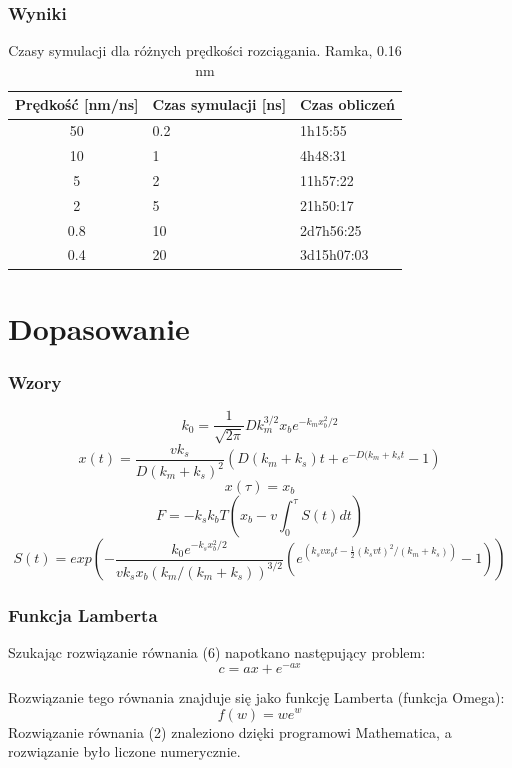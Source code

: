 \documentclass[10pt]{beamer}
\begin{document}
\begin{frame}
\frametitle{Wyniki}
\begin{center}
\begin{table}[h]
\centering
  \begin{tabular}{| c | l | l |}
  \hline
  Prędkość [nm/ns] & Czas symulacji [ns] & Czas obliczeń\\
  \hline
  50 & 0.2 & 1h15:55 \\
  10 & 1 & 4h48:31 \\
  5 & 2 & 11h57:22 \\
  2 & 5 & 21h50:17 \\
  0.8 & 10 & 2d7h56:25 \\
  0.4 & 20 & 3d15h07:03\\
  \hline
  \end{tabular}
  \caption{Czasy symulacji dla różnych prędkości rozciągania. Ramka, 0.16 nm}
\end{table}
\end{center}
\end{frame}
\section{Dopasowanie}

\begin{frame}
\frametitle{Wzory}
\begin{equation}
k_{0}=\frac{1}{\sqrt{2 \pi}}Dk_{m}^{3/2}x_{b}e^{-k_{m}x_{b}^{2}/2} 
\end{equation}
\begin{equation}
x(t)=\frac{vk_{s}}{D(k_{m}+k_{s})^{2}} (D(k_{m}+k_{s})t+e^{-D(k_{m}+k_{s}t}-1)
\end{equation}
\begin{equation}
x(\tau)=x_{b}
\end{equation}
\begin{equation}
F=-k_{s}k_{b}T(x_{b}-v \int_0^{\tau} S(t) dt)
\end{equation}
\begin{equation}
S(t)=exp(-\frac{k_{0}e^{-k_{s}x_{b}^{2}/2}}{vk_{s}x_{b}(k_{m}/(k_{m}+k_{s}))^{3/2}}(e^(k_{s}vx_{b}t-\frac{1}{2}(k_{s}vt)^{2}/(k_{m}+k_{s}))-1))
\end{equation}
\end{frame}

\begin{frame}
\frametitle{Funkcja Lamberta}
Szukając rozwiązanie równania (6) napotkano następujący problem:
\begin{equation}
c=ax + e^{-ax}
\end{equation}

Rozwiązanie tego równania znajduje się jako funkcję Lamberta (funkcja Omega):
\begin{equation}
f(w)=we^{w}
\end{equation}
Rozwiązanie równania (2) znaleziono dzięki programowi Mathematica, a rozwiązanie było liczone numerycznie.

\end{frame}
\end{document}
